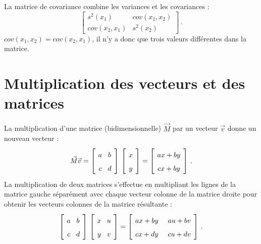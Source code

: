 La matrice de covariance combine les variances et les covariances :
\[
\left[ \begin{array}{ll} s^2(x_1) & \textit{cov}(x_1,x_2)\\ \textit{cov}(x_2,x_1)& s^2(x_2)\end{array}\right]\,.
\]
$\textit{cov}(x_1,x_2)=\textit{cov}(x_2,x_1)$, il n'y a donc que trois valeurs différentes dans la matrice.

\section{Multiplication des vecteurs et des matrices}\label{a.matrices}

La multiplication d'une matrice (bidimensionnelle) $\vec{M}$ par un vecteur $\vec{v}$ donne un nouveau vecteur :
\[
\spacearray
\vec{M}\vec{v}=\left[ \begin{array}{c} a\\c\end{array} \begin{array}{c} b\\d \end{array}\right]\, \left[ \begin{array}{c} x\\y\end{array}\right] = \left[ \begin{array}{c} ax+by\\cx+by\end{array}\right]\,.
\]
La multiplication de deux matrices s'effectue en multipliant les lignes de la matrice gauche séparément avec chaque vecteur colonne de la matrice droite pour obtenir les vecteurs colonnes de la matrice résultante :
\[
\spacearray
\left[ \begin{array}{c} a\\c\end{array} \begin{array}{c} b\\d \end{array}\right]\, \left[ \begin{array}{c} x\\y\end{array} \begin{array}{c} u\\v\end{array}\right] = \left[ \begin{array}{c} ax+by\\cx+dy\end{array} \;\; \begin{array}{c} au+bv\\cu+dv\end{array}\right]\,.
\]

